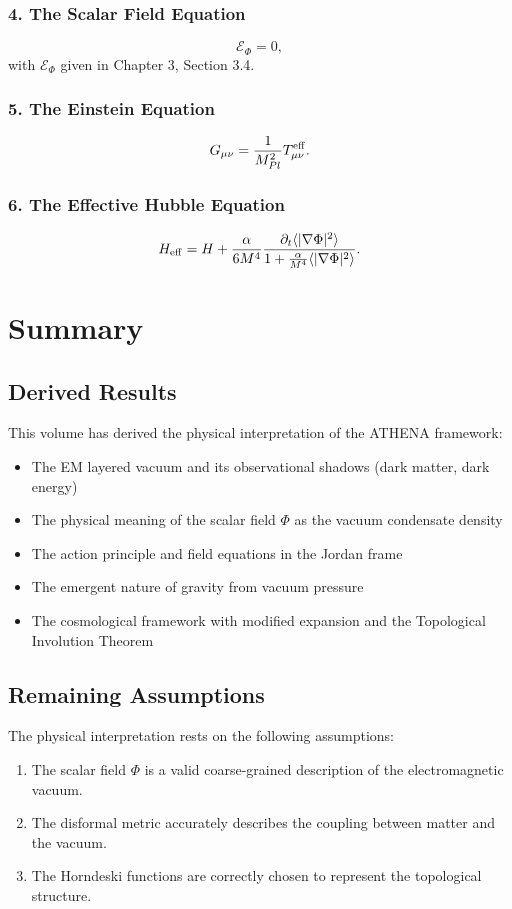 \documentclass[12pt,oneside]{book}
\begin{document}
\subsection{4. The Scalar Field Equation}
\[
\mathcal{E}_\Phi = 0,
\]
with $\mathcal{E}_\Phi$ given in Chapter 3, Section 3.4.

\subsection{5. The Einstein Equation}
\[
G_{\mu\nu} = \frac{1}{M_{Pl}^2} T_{\mu\nu}^{\rm eff}.
\]

\subsection{6. The Effective Hubble Equation}
\[
H_{\rm eff} = H + \frac{\alpha}{6M^4} \frac{\partial_t \langle |\nabla\Phi|^2 \rangle}{1 + \frac{\alpha}{M^4} \langle |\nabla\Phi|^2 \rangle}.
\]

\chapter{Summary}

\section{Derived Results}

This volume has derived the physical interpretation of the ATHENA framework:
\begin{itemize}
    \item The EM layered vacuum and its observational shadows (dark matter, dark energy)
    \item The physical meaning of the scalar field $\Phi$ as the vacuum condensate density
    \item The action principle and field equations in the Jordan frame
    \item The emergent nature of gravity from vacuum pressure
    \item The cosmological framework with modified expansion and the Topological Involution Theorem
\end{itemize}

\section{Remaining Assumptions}

The physical interpretation rests on the following assumptions:
\begin{enumerate}
    \item The scalar field $\Phi$ is a valid coarse-grained description of the electromagnetic vacuum.
    \item The disformal metric accurately describes the coupling between matter and the vacuum.
    \item The Horndeski functions are correctly chosen to represent the topological structure.
\end{enumerate}
\end{document}
